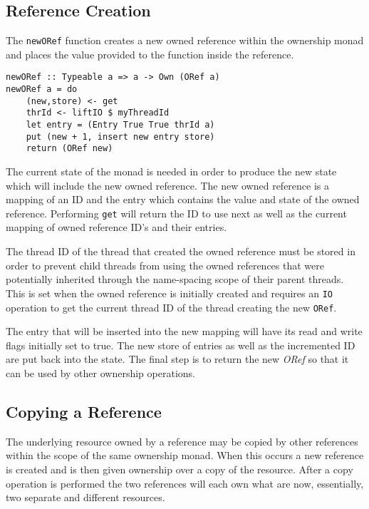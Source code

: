 \documentclass[onehalf,11pt]{beavtex}
\begin{document}
\subsection{Reference Creation}

The \texttt{newORef} function creates a new owned reference
within the ownership monad and places the value provided to the function
inside the reference. 

\begin{verbatim}
newORef :: Typeable a => a -> Own (ORef a)
newORef a = do
    (new,store) <- get
    thrId <- liftIO $ myThreadId
    let entry = (Entry True True thrId a)
    put (new + 1, insert new entry store)
    return (ORef new)
\end{verbatim}

The current state of the monad is needed in order
to produce the new state which will include the new owned reference.
The new owned reference is a mapping of an ID and the entry which contains
the value and state of the owned reference.
Performing \texttt{get} will return the ID to use next as well as the current
mapping of owned reference ID's and their entries.

The thread ID of the thread that created the owned reference must
be stored in order to prevent child threads from using the owned references that
were potentially inherited through the name-spacing scope of their parent
threads.  This is set when the owned reference is initially created and requires
an \texttt{IO} operation to get the current thread ID of the thread
creating the new \texttt{ORef}.

The entry that will be inserted into the new mapping will have its read and
write flags initially set to true.
The new store of entries as well as the incremented ID are put back into the
state.
The final step is to return the new \textit{ORef} so that it can be used by other
ownership operations.

\subsection{Copying a Reference}

The underlying resource owned by a reference may be copied by other references
within the scope of the same ownership monad.  When this occurs a new
reference is created and is then given ownership over a copy of the resource.
After a copy operation is performed the two references will each own what are now,
essentially, two separate and different resources.
\end{document}
